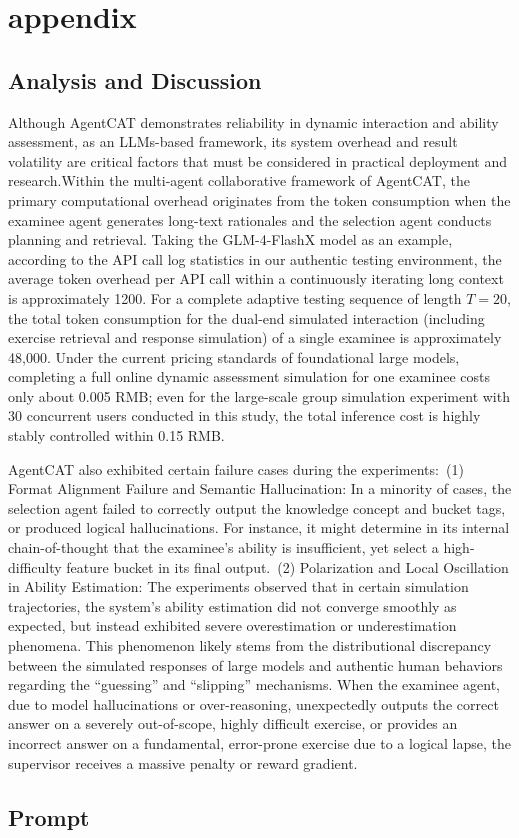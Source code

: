 
\section{appendix}

\subsection{Analysis and Discussion}
Although AgentCAT demonstrates reliability in dynamic interaction and ability assessment, as an LLMs-based framework, its system overhead and result volatility are critical factors that must be considered in practical deployment and research.Within the multi-agent collaborative framework of AgentCAT, the primary computational overhead originates from the token consumption when the examinee agent generates long-text rationales and the selection agent conducts planning and retrieval. Taking the GLM-4-FlashX model as an example, according to the API call log statistics in our authentic testing environment, the average token overhead per API call within a continuously iterating long context is approximately 1200. For a complete adaptive testing sequence of length $T=20$, the total token consumption for the dual-end simulated interaction (including exercise retrieval and response simulation) of a single examinee is approximately 48,000. Under the current pricing standards of foundational large models, completing a full online dynamic assessment simulation for one examinee costs only about 0.005 RMB; even for the large-scale group simulation experiment with 30 concurrent users conducted in this study, the total inference cost is highly stably controlled within 0.15 RMB.

AgentCAT also exhibited certain failure cases during the experiments:~(1) Format Alignment Failure and Semantic Hallucination: In a minority of cases, the selection agent failed to correctly output the knowledge concept and bucket tags, or produced logical hallucinations. For instance, it might determine in its internal chain-of-thought that the examinee's ability is insufficient, yet select a high-difficulty feature bucket in its final output.~(2) Polarization and Local Oscillation in Ability Estimation: The experiments observed that in certain simulation trajectories, the system's ability estimation did not converge smoothly as expected, but instead exhibited severe overestimation or underestimation phenomena. This phenomenon likely stems from the distributional discrepancy between the simulated responses of large models and authentic human behaviors regarding the ``guessing'' and    ``slipping'' mechanisms. When the examinee agent, due to model hallucinations or over-reasoning, unexpectedly outputs the correct answer on a severely out-of-scope, highly difficult exercise, or provides an incorrect answer on a fundamental, error-prone exercise due to a logical lapse, the supervisor receives a massive penalty or reward gradient.


\subsection{Prompt}
